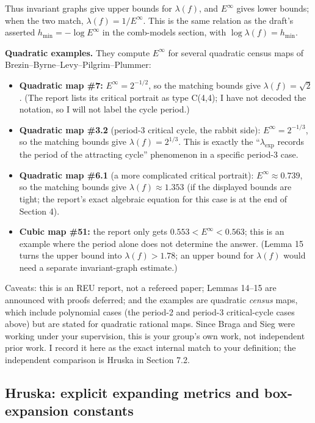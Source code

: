 \documentclass[
]{article}
\providecommand{\tightlist}{%
  \setlength{\itemsep}{0pt}\setlength{\parskip}{0pt}}
\begin{document}
Thus invariant graphs give upper bounds for \(\lambda(f)\), and
\(E^\infty\) gives lower bounds; when the two match,
\(\lambda(f)=1/E^\infty\). This is the same relation as the draft's
asserted \(h_{\min}=-\log E^\infty\) in the comb-models section, with
\(\log\lambda(f)=h_{\min}\).

\textbf{Quadratic examples.} They compute \(E^\infty\) for several
quadratic census maps of Brezin--Byrne--Levy--Pilgrim--Plummer:

\begin{itemize}
\tightlist
\item
  \textbf{Quadratic map \#7:} \(E^\infty=2^{-1/2}\), so the matching
  bounds give \(\lambda(f)=\sqrt2\). (The report lists its critical
  portrait as type C(4,4); I have not decoded the notation, so I will
  not label the cycle period.)
\item
  \textbf{Quadratic map \#3.2} (period-3 critical cycle, the rabbit
  side): \(E^\infty=2^{-1/3}\), so the matching bounds give
  \(\lambda(f)=2^{1/3}\). This is exactly the ``\(\lambda_{\exp}\)
  records the period of the attracting cycle'' phenomenon in a specific
  period-3 case.
\item
  \textbf{Quadratic map \#6.1} (a more complicated critical portrait):
  \(E^\infty\approx0.739\), so the matching bounds give
  \(\lambda(f)\approx1.353\) (if the displayed bounds are tight; the
  report's exact algebraic equation for this case is at the end of Section 4).
\item
  \textbf{Cubic map \#51:} the report only gets
  \(0.553<E^\infty<0.563\); this is an example where the period alone
  does not determine the answer. (Lemma 15 turns the upper bound into
  \(\lambda(f)>1.78\); an upper bound for \(\lambda(f)\) would need a
  separate invariant-graph estimate.)
\end{itemize}

Caveats: this is an REU report, not a refereed paper; Lemmas 14--15 are
announced with proofs deferred; and the examples are quadratic
\emph{census} maps, which include polynomial cases (the period-2 and
period-3 critical-cycle cases above) but are stated for quadratic
rational maps. Since Braga and Sieg were working under your supervision,
this is your group's own work, not independent prior work. I record it
here as the exact internal match to your definition; the independent
comparison is Hruska in Section 7.2.

\subsection{Hruska: explicit expanding metrics and box-expansion
constants}\label{hruska-explicit-expanding-metrics-and-box-expansion-constants}
\end{document}
